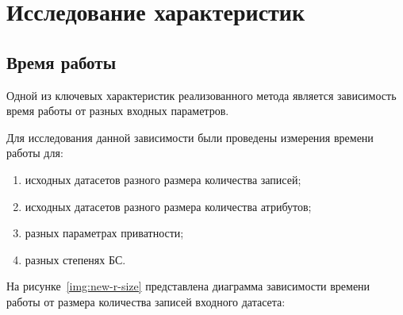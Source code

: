 	







\section{Исследование характеристик}

\subsection{Время работы}

Одной из ключевых характеристик реализованного метода является зависимость время работы от разных входных параметров.

Для исследования данной зависимости были проведены измерения времени работы для:
\begin{enumerate}
	\item исходных датасетов разного размера количества записей;
	\item исходных датасетов разного размера количества атрибутов;
	\item разных параметрах приватности;
	\item разных степенях БС.
\end{enumerate}
\newpage
На рисунке~\ref{img:new-r-size} представлена диаграмма зависимости времени работы от размера количества записей входного датасета:

